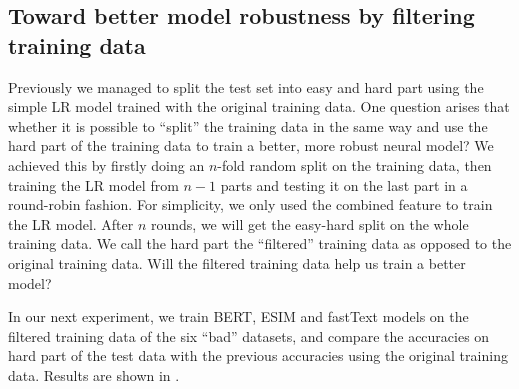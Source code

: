 \subsection{Toward better model robustness by filtering training data}
\label{sec:experiment3}
%
Previously we managed to split the test set into easy and hard part using
the simple LR model trained with the original training data.
One question arises that whether it is possible to ``split'' the training
data in the same way and use the hard part of the training data to
train a better, more robust neural model?
We achieved this by firstly doing an $n$-fold random split on the training
data, then training the LR model from $n-1$ parts and testing it on the
last part in a round-robin fashion.
For simplicity, we only used the combined feature to train the LR model. 
After $n$ rounds, we will get the easy-hard split on the whole
training data. We call the hard part the ``filtered'' training data
as opposed to the original training data. 
Will the filtered training data help us train a better model?

In our next experiment, we train BERT, ESIM and fastText models
on the filtered training data of the six ``bad'' datasets, 
and compare the accuracies on hard part of the test data with the previous accuracies
using the original training data. 
Results are shown in . 


